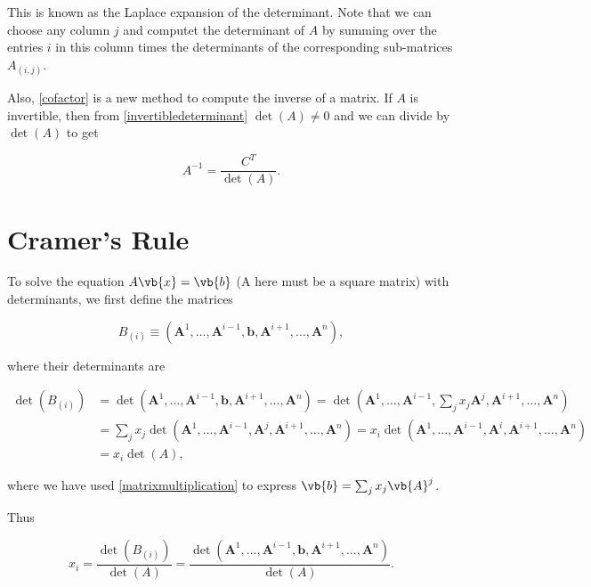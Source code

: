 \documentclass[a4paper,12pt]{report}
\begin{document}
This is known as the Laplace expansion of the determinant. Note that we can choose any column \(j\) and computet the determinant of \(A\) by summing over the entries \(i\) in this column times the determinants of the corresponding sub-matrices \(A_{(i,j)} \). 

Also, \cref{cofactor} is a new method to compute the inverse of a matrix. If \(A\) is invertible, then from \cref{invertibledeterminant} \(\det (A) \neq 0\) and we can divide by \(\det (A)\) to get 

\begin{equation}
    A^{-1} = \frac{C^{T} }{\det (A)}.   
\end{equation}
\section{Cramer's Rule}

To solve the equation \(A\vb{x} = \vb{b} \) (A here must be a square matrix) with determinants, we first define the matrices 

\begin{equation}
B_{(i)} \equiv  (\mathbf{A}^1, \ldots, \mathbf{A}^{i-1}, \mathbf{b}, \mathbf{A}^{i+1}, \ldots, \mathbf{A}^n), 
\end{equation}

where their determinants are

\begin{equation}
\begin{aligned}
\det(B_{(i)}) &= \det(\mathbf{A}^1, \ldots, \mathbf{A}^{i-1}, \mathbf{b}, \mathbf{A}^{i+1}, \ldots, \mathbf{A}^n) = \det(\mathbf{A}^1, \ldots, \mathbf{A}^{i-1}, \sum_{j} x_j \mathbf{A}^j, \mathbf{A}^{i+1}, \ldots, \mathbf{A}^n) \\
&= \sum_{j} x_j \det(\mathbf{A}^1, \ldots, \mathbf{A}^{i-1}, \mathbf{A}^j, \mathbf{A}^{i+1}, \ldots, \mathbf{A}^n) = x_i \det(\mathbf{A}^1, \ldots, \mathbf{A}^{i-1}, \mathbf{A}^i, \mathbf{A}^{i+1}, \ldots, \mathbf{A}^n) \\
&= x_i \det(A),
\end{aligned}
\end{equation}

where we have used \cref{matrixmultiplication} to express \(\vb{b}  = \sum_{j}^{} x_{j}\vb{A} ^{j}  \).  

Thus

\begin{equation}
x_i = \frac{\det(B_{(i)})}{\det(A)} = \frac{\det(\mathbf{A}^1, \ldots, \mathbf{A}^{i-1}, \mathbf{b}, \mathbf{A}^{i+1}, \ldots, \mathbf{A}^n)}{\det(A)} .
\end{equation}
\end{document}
